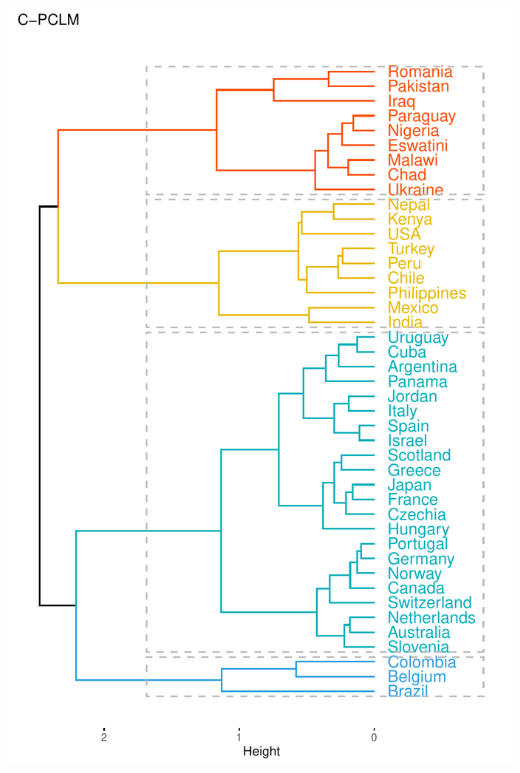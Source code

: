 \documentclass[table,xcdraw,dvipsnames]{beamer}
\begin{document}
\begin{frame}[fragile]
{\begin{columns}
			\begin{column}{5cm}
				\includegraphics[scale=.3]{Figures/CombDendo.pdf}
			\end{column}
		\end{columns}
	}
\end{frame}
\end{document}

